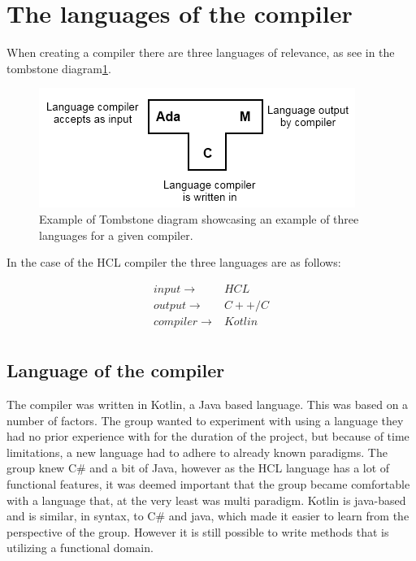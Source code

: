 \section{The languages of the compiler}
When creating a compiler there are three languages of relevance, as see in the tombstone diagram\ref{fig:TStoneExample}.

\begin{figure}[H]
	\centering
	\includegraphics[width=\textwidth/2+\textwidth/4]{4.Solution/images/T-diagram.png}
	\caption{
		Example of Tombstone diagram showcasing an example of three languages for a given compiler.\cite{TStoneWiki}
	}
	\label{fig:TStoneExample}
\end{figure}
In the case of the HCL compiler the three languages are as follows:

\begin{align*}
input \to & HCL \\
output \to & C++/C \\
compiler \to & Kotlin \\
\end{align*}

\subsection{Language of the compiler}
The compiler was written in Kotlin\cite{KotlinWebsite}, a Java based language.
This was based on a number of factors.
The group wanted to experiment with using a language they had no prior experience with for the duration of the project, but because of time limitations, a new language had to adhere to already known paradigms.
The group knew C\# and a bit of Java, however as the HCL language has a lot of functional features, it was deemed important that the group became comfortable with a language that, at the very least was multi paradigm.
Kotlin is java-based and is similar, in syntax, to C\# and java, which made it easier to learn from the perspective of the group.
However it is still possible to write methods that is utilizing a functional domain.

